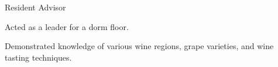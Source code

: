 {
	{Resident Advisor} \hfill{}\newline
}
{\item{Acted as a leader for a dorm floor.}}

{
}
{\item{Demonstrated knowledge of various wine regions, grape varieties, and wine tasting techniques.}}


